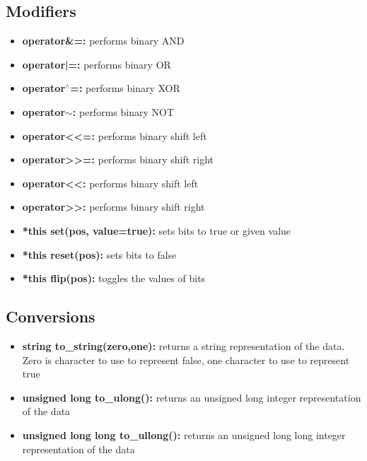 \documentclass{report}
\begin{document}
        \subsection{Modifiers}
        \begin{itemize}
            \item \textbf{operator\&=:} performs binary AND
            \item \textbf{operator|=:} performs binary OR
            \item \textbf{operator$^{\land}$=:} performs binary XOR
            \item \textbf{operator$\sim$:} performs binary NOT
            \item \textbf{operator<<=:} performs binary shift left
            \item \textbf{operator>>=:} performs binary shift right
            \item \textbf{operator<<:} performs binary shift left
            \item \textbf{operator>>:} performs binary shift right
            \item \textbf{*this set(pos, value=true):} sets bits to true or given value
            \item \textbf{*this reset(pos):} sets bits to false
            \item \textbf{*this flip(pos):} toggles the values of bits
        \end{itemize}

        \bigbreak \noindent 
        \subsection{Conversions}
        \begin{itemize}
            \item \textbf{string to\_string(zero,one):} returns a string representation of the data. Zero is character to use to represent false, one character to use to represent true
            \item \textbf{unsigned long to\_ulong():} returns an unsigned long integer representation of the data
            \item \textbf{unsigned long long to\_ullong():} returns an unsigned long long integer representation of the data
        \end{itemize}
\end{document}

